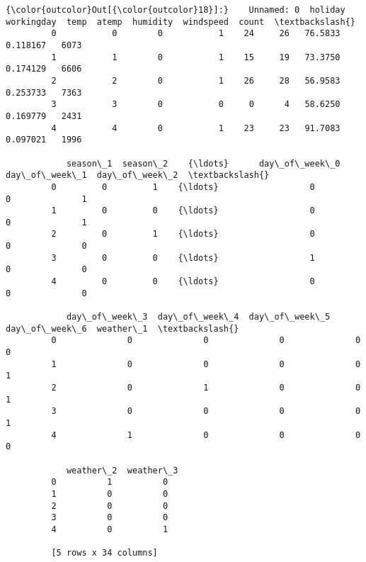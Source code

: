 \documentclass[11pt]{article}
\begin{document}
\begin{Verbatim}[commandchars=\\\{\}]
{\color{outcolor}Out[{\color{outcolor}18}]:}    Unnamed: 0  holiday  workingday  temp  atemp  humidity  windspeed  count  \textbackslash{}
         0           0        0           1    24     26   76.5833   0.118167   6073   
         1           1        0           1    15     19   73.3750   0.174129   6606   
         2           2        0           1    26     28   56.9583   0.253733   7363   
         3           3        0           0     0      4   58.6250   0.169779   2431   
         4           4        0           1    23     23   91.7083   0.097021   1996   
         
            season\_1  season\_2    {\ldots}      day\_of\_week\_0  day\_of\_week\_1  day\_of\_week\_2  \textbackslash{}
         0         0         1    {\ldots}                  0              0              1   
         1         0         0    {\ldots}                  0              0              1   
         2         0         1    {\ldots}                  0              0              0   
         3         0         0    {\ldots}                  1              0              0   
         4         0         0    {\ldots}                  0              0              0   
         
            day\_of\_week\_3  day\_of\_week\_4  day\_of\_week\_5  day\_of\_week\_6  weather\_1  \textbackslash{}
         0              0              0              0              0          0   
         1              0              0              0              0          1   
         2              0              1              0              0          1   
         3              0              0              0              0          1   
         4              1              0              0              0          0   
         
            weather\_2  weather\_3  
         0          1          0  
         1          0          0  
         2          0          0  
         3          0          0  
         4          0          1  
         
         [5 rows x 34 columns]
\end{Verbatim}
            
\end{document}
